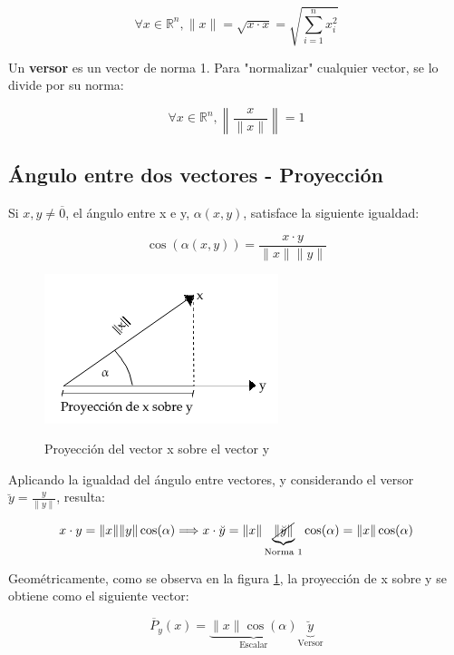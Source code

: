 \documentclass{article}
\renewcommand{\Bbb}{\mathbb}
\begin{document}
\begin{equation}
\forall x \in \Bbb R^n, \|x\| = \sqrt{x \cdot x} = \sqrt{ \sum_{i=1}^{n} x_i^2 }
\end{equation}

Un \textbf{versor} es un vector de norma 1. Para "normalizar" cualquier vector, se lo divide por su norma:

\begin{equation}
\forall x \in \Bbb R^n, \left\| \frac{x}{\|x\|} \right\| = 1
\end{equation}

\subsection{Ángulo entre dos vectores - Proyección}

Si $x, y \neq \overline{0}$, el ángulo entre x e y, $\alpha(x,y)$, satisface la siguiente igualdad:

\begin{equation}
\cos (\alpha(x, y)) = \frac{x \cdot y}{ \|x\| \|y\| }
\end{equation}

\begin{figure}[t]
\caption{Proyección del vector x sobre el vector y}
\includegraphics[scale=1]{img/fig001_proyeccion.png} 
\centering
\label{fig:proyeccion}
\end{figure}

Aplicando la igualdad del ángulo entre vectores, y considerando el versor $\breve{y} = \frac{y}{\|y\|}$, resulta:

\begin{equation}
x \cdot y = \|x\| \|y\| \cos(\alpha) \Longrightarrow x \cdot \breve{y} = \|x\| \underbrace{ \cancel{ \| \breve{y} \| } }_{\text{Norma 1}} \cos(\alpha) = \|x\| \cos(\alpha)
\end{equation}

Geométricamente, como se observa en la figura \ref{fig:proyeccion}, la proyección de x sobre y se obtiene como el siguiente vector:

\begin{equation}
\overline{P}_{y}(x) =  \underbrace{ \|x\| \cos(\alpha) }_{\text{Escalar}}  \underbrace{ \breve{y} }_{\text{Versor}}
\end{equation}
\end{document}
